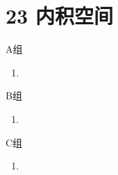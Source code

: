 \section*{23 内积空间}

\vspace{2ex}

\centerline{\heiti A组}
\begin{enumerate}
    \item
\end{enumerate}

\centerline{\heiti B组}
\begin{enumerate}
    \item
\end{enumerate}

\centerline{\heiti C组}
\begin{enumerate}
    \item
\end{enumerate}

\clearpage
